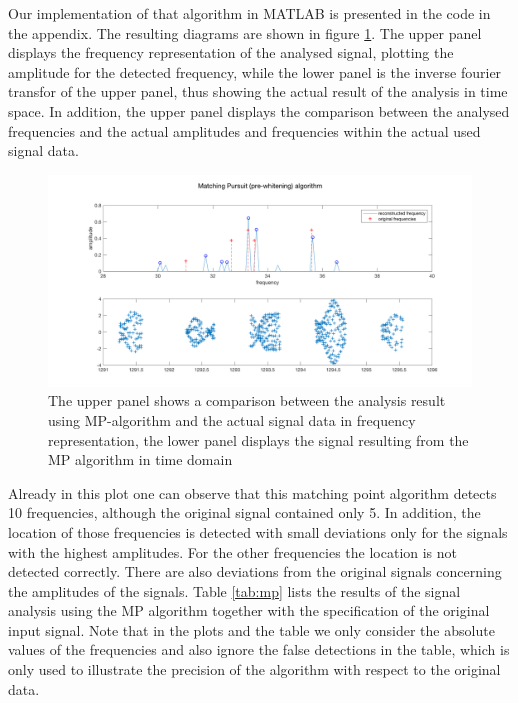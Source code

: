 Our implementation of that algorithm in MATLAB is presented in the code in the appendix. The resulting diagrams are shown in figure \ref{fig:mp}. The upper panel displays the frequency representation of the analysed signal, plotting the amplitude for the detected frequency, while the lower panel is the inverse fourier transfor of the upper panel, thus showing the actual result of the analysis in time space. In addition, the upper panel displays the comparison between the analysed frequencies and the actual amplitudes and frequencies within the actual used signal data.

\begin{figure}[!h]
	\centering
		\includegraphics[width=\textwidth]{images/mp}
		\caption{The upper panel shows a comparison between the analysis result using MP-algorithm and the actual signal data in frequency representation, the lower panel displays the signal resulting from the MP algorithm in time domain}
		\label{fig:mp}
\end{figure}

Already in this plot one can observe that this matching point algorithm detects 10 frequencies, although the original signal contained only 5. In addition, the location of those frequencies is detected with small deviations only for the signals with the highest amplitudes.  For the other frequencies the location is not detected correctly. There are also deviations from the original signals concerning the amplitudes of the signals. Table \ref{tab:mp} lists the results of the signal analysis using the MP algorithm together with the specification of the original input signal. Note that in the plots and the table we only consider the absolute values of the frequencies and also ignore the false detections in the table, which is only used to illustrate the precision of the algorithm with respect to the original data.

